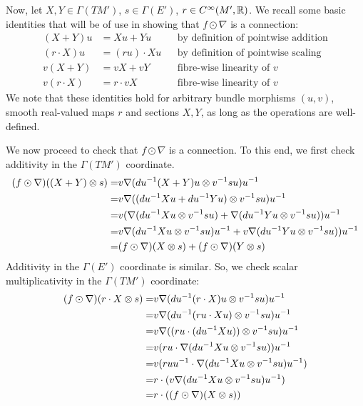 \documentclass[./Thick_TQFTs_and_Quantum_Information.tex]{subfiles}
\begin{document}
Now, let $X, Y \in \Gamma(TM')$, $s \in \Gamma(E')$, $r \in C^{\infty}(M', \mathbb{R})$.
We recall some basic identities that will be of use in showing that
$f \odot \nabla$ is a connection:
\begin{align*}
(X + Y)u &= Xu + Yu && \text{by definition of pointwise addition} \\
(r \cdot X)u &= (ru) \cdot Xu && \text{by definition of pointwise scaling} \\
v(X + Y) &= vX + vY && \text{fibre-wise linearity of $v$} \\
v(r \cdot X) &= r \cdot vX && \text{fibre-wise linearity of $v$}
\end{align*}
We note that these identities hold for arbitrary bundle morphisms $(u, v)$,
smooth real-valued maps $r$ and sections $X, Y$, as long as the operations are
well-defined.

We now proceed to check that $f \odot \nabla$ is a connection. To this end, we
first check additivity in the $\Gamma(TM')$ coordinate.
\begin{align*}
(f \odot \nabla)((X + Y) \otimes s)
=& v\nabla(du^{-1}(X + Y)u \otimes v^{-1}su)u^{-1} \\
=& v\nabla((du^{-1}Xu + du^{-1}Yu) \otimes v^{-1}su)u^{-1} \\
=& v(\nabla(du^{-1}Xu \otimes v^{-1}su)
 + \nabla(du^{-1}Yu \otimes v^{-1}su))u^{-1} \\
=& v\nabla(du^{-1}Xu \otimes v^{-1}su)u^{-1}
 + v\nabla(du^{-1}Yu \otimes v^{-1}su))u^{-1} \\
=& (f \odot \nabla)(X \otimes s) + (f \odot \nabla)(Y \otimes s)
\end{align*}
Additivity in the $\Gamma(E')$ coordinate is similar. So, we check scalar
multiplicativity in the $\Gamma(TM')$ coordinate:
\begin{align*}
(f \odot \nabla)(r \cdot X \otimes s)
=& v\nabla(du^{-1}(r \cdot X)u \otimes v^{-1}su)u^{-1} \\
=& v\nabla(du^{-1}(ru \cdot Xu) \otimes v^{-1}su)u^{-1} \\
=& v\nabla((ru \cdot (du^{-1}Xu)) \otimes v^{-1}su)u^{-1} \\
=& v (ru \cdot \nabla(du^{-1}Xu \otimes v^{-1}su))u^{-1} \\
=& v (ruu^{-1} \cdot \nabla(du^{-1}Xu \otimes v^{-1}su)u^{-1}) \\
=& r \cdot (v\nabla(du^{-1}Xu \otimes v^{-1}su)u^{-1}) \\
=& r \cdot ((f \odot \nabla)(X \otimes s))
\end{align*}
\end{document}
